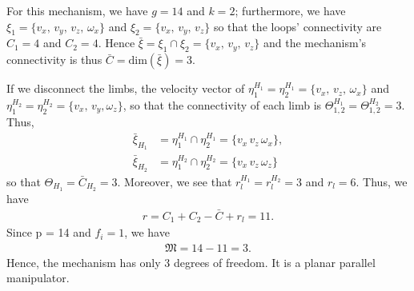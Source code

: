 \begin{solution}
	For this mechanism, we have $g=14$ and $k=2$; furthermore, we have $\xi_1 = \{v_x, \, v_y, \, v_z, \, \omega_x\}$ and $\xi_2 = \{v_x,\, v_y, \, v_z \}$ so that the loops' connectivity are $C_1 = 4$ and $C_2 = 4$. Hence $\bar{\xi} = \xi_1 \cap \xi_2 = \{v_x, \, v_y, \, v_z\}$ and the mechanism's connectivity is thus $\bar{C} = \text{dim} (\bar{\xi}) = 3$.
	
	If we disconnect the limbs, the velocity vector of $\eta_1^{H_1} = \eta_2^{H_1} = \{v_x, \, v_z, \, \omega_x\}$ and $\eta_1^{H_2} = \eta_2^{H_2} = \{v_x, \, v_y, \omega_z \}$, so that the connectivity of each limb is $\Theta_{1,2}^{H_1} = \Theta_{1,2}^{H_2} = 3$. Thus,
	\begin{align}
	\bar{\xi}_{H_1} &= \eta_1^{H_1} \cap \eta_2^{H_1} = \{ v_x \, v_z \, \omega_x\}, \nonumber \\
	\bar{\xi}_{H_2} &= \eta_1^{H_2} \cap \eta_2^{H_2} = \{ v_x \, v_z \, \omega_z\}
	\end{align}
	so that $\Theta_{H_1} = \bar{C}_{H_2} = 3$.
	Moreover, we see that $r_l^{H_1} = r_l^{H_2} = 3$ and $r_l = 6$. Thus, we have
	\begin{align}
	r = C_1 + C_2 - \bar{C} + r_l = 11.
	\end{align}
	Since p = 14 and $f_i = 1$, we have 
	\begin{align}
	\mathfrak{M} = 14 - 11 = 3. 
	\end{align}
	Hence, the mechanism has only 3 degrees of freedom. It is a planar parallel manipulator.	
\end{solution}
